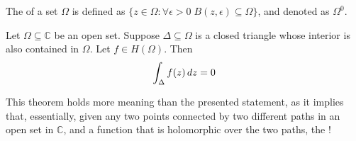 \documentclass[notoc,notitlepage]{tufte-book}
\begin{document}
\begin{note}[Recall]
	The  of a set $\Omega$ is defined as $\{z \in \Omega : \forall \epsilon > 0 \; B(z, \epsilon) \subseteq \Omega\}$, and denoted as $\Omega^0$.
\end{note}

\begin{thm}\label{thm:goursat_s_theorem}
	Let $\Omega \subseteq \mathbb{C}$ be an open set. Suppose $\Delta \subseteq \Omega$ is a closed triangle whose interior is also contained in $\Omega$. Let $f \in H(\Omega)$. Then
	\begin{equation*}
		\int_{\Delta} f(z) \mathop{}\!d{z} = 0
	\end{equation*}
\end{thm}

This theorem holds more meaning than the presented statement, as it implies that, essentially, given any two points connected by two different paths in an open set in $\mathbb{C}$, and a function that is holomorphic over the two paths, the !
\end{document}
